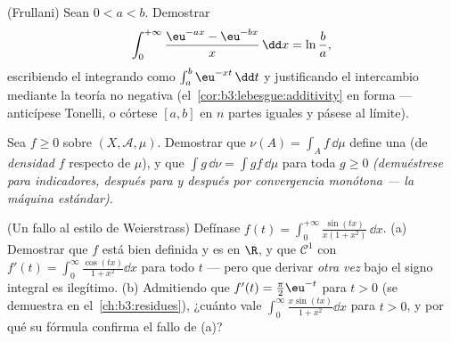 \begin{exercise}[$\star\star\star$]\label{exo:b3:lebesgue:8}
(Frullani) Sean $0 < a < b$. Demostrar
\[
\int_0^{+\infty}\frac{\eu^{-ax} - \eu^{-bx}}{x}\,\dd x =
\ln\frac ba,
\]
escribiendo el integrando como $\int_a^b \eu^{-xt}\,\dd t$ y
justificando el intercambio mediante la teoría no negativa
(el~\cref{cor:b3:lebesgue:additivity} en forma
 --- anticípese Tonelli, o
córtese $[a,b]$ en $n$ partes iguales y pásese al límite).
\end{exercise}

\begin{exercise}[$\star\star$]\label{exo:b3:lebesgue:9}
Sea $f \geq 0$  sobre
$(X, \mathcal A, \mu)$. Demostrar que $\nu(A) = \int_A f\,\dd\mu$ define
una  (de
\emph{densidad} $f$ respecto de $\mu$), y
que $\int g\,\dd\nu = \int gf\,\dd\mu$ para toda $g \geq 0$
 \emph{(demuéstrese para
indicadores, después para  y después por convergencia monótona --- la máquina estándar)}.
\end{exercise}

\begin{exercise}[$\star\star\star$]\label{exo:b3:lebesgue:10}
(Un fallo al estilo de Weierstrass) Defínase $f(t) =
\int_0^{+\infty}\frac{\sin(tx)}{x(1 + x^2)}\,\dd x$. (a) Demostrar que
$f$ está bien definida y es
 en $\R$, y que
$\mathcal C^1$ con $f'(t) = \int_0^\infty\frac{\cos(tx)}{1 +
x^2}\dd x$ para todo $t$ --- pero que derivar \emph{otra vez} bajo el
signo integral es ilegítimo. (b) Admitiendo que
$f'(t) = \frac\pi2\eu^{-t}$ para $t > 0$ (se demuestra en
el~\cref{ch:b3:residues}), ¿cuánto vale
$\int_0^\infty\frac{x\sin(tx)}{1+x^2}\dd x$ para $t > 0$, y por qué su
fórmula confirma el fallo de (a)?
\end{exercise}


